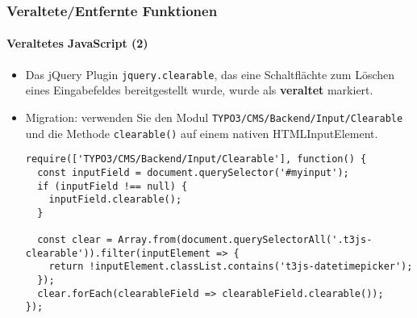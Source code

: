 
\begin{frame}[fragile]
	\frametitle{Veraltete/Entfernte Funktionen}
	\framesubtitle{Veraltetes JavaScript (2)}

	\lstset{basicstyle=\tiny\ttfamily}

	\begin{itemize}
		\item Das jQuery Plugin \texttt{jquery.clearable}, das eine Schaltflächte zum Löschen eines
			 Eingabefeldes bereitgestellt wurde, wurde als \textbf{veraltet} markiert.
		\item Migration: verwenden Sie den Modul \small\texttt{TYPO3/CMS/Backend/Input/Clearable}\normalsize
			und die Methode \texttt{clearable()} auf einem nativen HTMLInputElement.

\begin{lstlisting}
require(['TYPO3/CMS/Backend/Input/Clearable'], function() {
  const inputField = document.querySelector('#myinput');
  if (inputField !== null) {
    inputField.clearable();
  }

  const clear = Array.from(document.querySelectorAll('.t3js-clearable')).filter(inputElement => {
    return !inputElement.classList.contains('t3js-datetimepicker');
  });
  clear.forEach(clearableField => clearableField.clearable());
});
\end{lstlisting}

	\end{itemize}

\end{frame}


